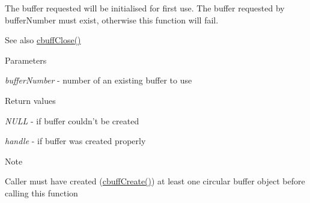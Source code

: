 The buffer requested will be initialised for first use. The buffer requested by bufferNumber must exist, otherwise this function will fail.

\begin{DoxySeeAlso}{See also}
\hyperlink{group___c_b_u_f_fopen_c_lose_functions_ga66a96e9abf5e7ea12779edb9c49c3043}{cbuffClose()}
\end{DoxySeeAlso}

\begin{DoxyParams}{Parameters}
\item[{\em bufferNumber}]-\/ number of an existing buffer to use\end{DoxyParams}

\begin{DoxyRetVals}{Return values}
\item[{\em NULL}]-\/ if buffer couldn't be created \item[{\em handle}]-\/ if buffer was created properly\end{DoxyRetVals}
\begin{DoxyNote}{Note}

\begin{DoxyEnumerate}
\item Caller must have created (\hyperlink{group___c_b_u_f_fcreate_destroy_functions_gaeeaed884818fd76417da6347fd033a44}{cbuffCreate()}) at least one circular buffer object before calling this function 
\end{DoxyEnumerate}
\end{DoxyNote}

